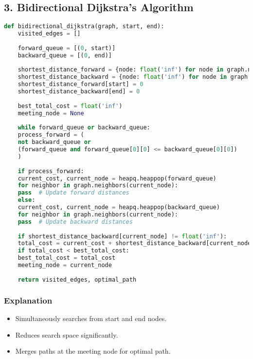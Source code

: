 \subsection*{3. Bidirectional Dijkstra's Algorithm}
\begin{lstlisting}[language=Python, caption=Bidirectional Dijkstra's Algorithm]
	def bidirectional_dijkstra(graph, start, end):
	visited_edges = []
	
	forward_queue = [(0, start)]
	backward_queue = [(0, end)]
	
	shortest_distance_forward = {node: float('inf') for node in graph.nodes}
	shortest_distance_backward = {node: float('inf') for node in graph.nodes}
	shortest_distance_forward[start] = 0
	shortest_distance_backward[end] = 0
	
	best_total_cost = float('inf')
	meeting_node = None
	
	while forward_queue or backward_queue:
	process_forward = (
	not backward_queue or
	(forward_queue and forward_queue[0][0] <= backward_queue[0][0])
	)
	
	if process_forward:
	current_cost, current_node = heapq.heappop(forward_queue)
	for neighbor in graph.neighbors(current_node):
	pass  # Update forward distances
	else:
	current_cost, current_node = heapq.heappop(backward_queue)
	for neighbor in graph.neighbors(current_node):
	pass  # Update backward distances
	
	if shortest_distance_backward[current_node] != float('inf'):
	total_cost = current_cost + shortest_distance_backward[current_node]
	if total_cost < best_total_cost:
	best_total_cost = total_cost
	meeting_node = current_node
	
	return visited_edges, optimal_path
\end{lstlisting}

\subsubsection*{Explanation}
\begin{itemize}
	\item Simultaneously searches from start and end nodes.
	\item Reduces search space significantly.
	\item Merges paths at the meeting node for optimal path.
\end{itemize}



